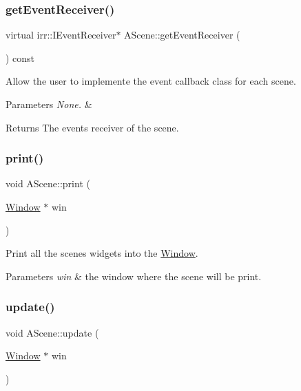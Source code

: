 \subsubsection{\texorpdfstring{get\+Event\+Receiver()}{getEventReceiver()}}
{\footnotesize\ttfamily virtual irr\+::\+I\+Event\+Receiver$\ast$ A\+Scene\+::get\+Event\+Receiver (\begin{DoxyParamCaption}{ }\end{DoxyParamCaption}) const\hspace{0.3cm}{\ttfamily [pure virtual]}}



Allow the user to implemente the event callback class for each scene. 


\begin{DoxyParams}{Parameters}
{\em None.} & \\
\hline
\end{DoxyParams}
\begin{DoxyReturn}{Returns}
The events\textquotesingle{} receiver of the scene. 
\end{DoxyReturn}
\mbox{\label{classAScene_ae5d7463a823ed64f3846b5847340b68c}} 
\subsubsection{\texorpdfstring{print()}{print()}}
{\footnotesize\ttfamily void A\+Scene\+::print (\begin{DoxyParamCaption}\item[{\hyperlink{classWindow}{Window} $\ast$}]{win }\end{DoxyParamCaption})}



Print all the scene\textquotesingle{}s widgets into the \hyperlink{classWindow}{Window}. 


\begin{DoxyParams}{Parameters}
{\em \textquotesingle{}win\textquotesingle{}} & the window where the scene will be print. \\
\hline
\end{DoxyParams}
\mbox{\label{classAScene_a59f0acef6ed02a578062decd0f907773}} 
\subsubsection{\texorpdfstring{update()}{update()}}
{\footnotesize\ttfamily void A\+Scene\+::update (\begin{DoxyParamCaption}\item[{\hyperlink{classWindow}{Window} $\ast$}]{win }\end{DoxyParamCaption})}



